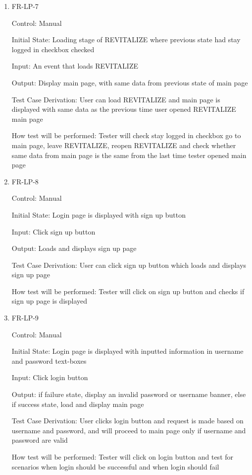 \documentclass[12pt, titlepage]{article}
\begin{document}
\begin{enumerate}
	\item{FR-LP-7\\}
	
	Control: Manual
	
	Initial State: Loading stage of REVITALIZE where previous state had stay logged in checkbox checked
	
	Input: An event that loads REVITALIZE
	
	Output: Display main page, with same data from previous state of main page
	
	Test Case Derivation: User can load REVITALIZE and main page is displayed with same data as the previous time user opened REVITALIZE main page
	
	How test will be performed: Tester will check stay logged in checkbox go to main page, leave REVITALIZE, reopen REVITALIZE and check whether same data from main page is the same from the last time tester opened main page
	
	\item{FR-LP-8\\}
	
	Control: Manual
	
	Initial State: Login page is displayed with sign up button
	
	Input: Click sign up button
	
	Output: Loads and displays sign up page
	
	Test Case Derivation: User can click sign up button which loads and displays sign up page
	
	How test will be performed: Tester will click on sign up button and checks if sign up page is displayed
	
	\item{FR-LP-9\\}
	
	Control: Manual
	
	Initial State: Login page is displayed with inputted information in username and password text-boxes
	
	Input: Click login button
	
	Output: if failure state, display an invalid password or username banner, else if success state, load and display main page
	
	Test Case Derivation: User clicks login button and request is made based on username and password, and will proceed to main page only if username and password are valid
	
	How test will be performed: Tester will click on login button and test for scenarios when login should be successful and when login should fail
	
	
\end{enumerate}
\end{document}

